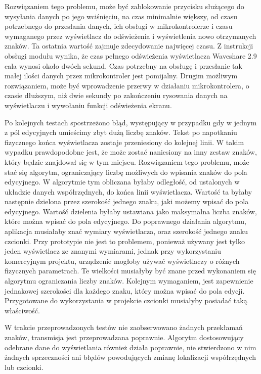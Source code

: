 \documentclass[a4paper,12pt, twoside]{article}
\begin{document}
    	Rozwiązaniem tego problemu, może być zablokowanie przycisku służącego do wysyłania danych po jego wciśnięciu, na czas minimalnie większy, od czasu potrzebnego do przesłania danych, ich obsługi w mikrokontrolerze i czasu wymaganego przez wyświetlacz do odświeżenia i wyświetlenia nowo otrzymanych znaków. Ta ostatnia wartość zajmuje zdecydowanie najwięcej czasu. Z instrukcji obsługi modułu wynika, że czas pełnego odświeżenia wyświetlacza Waveshare 2.9 cala wynosi około dwóch sekund\cite{waveshare}. Czas potrzebny na obsługę i przesłanie tak małej ilości danych przez mikrokontroler jest pomijalny. Drugim możliwym rozwiązaniem, może być wprowadzenie przerwy w działaniu mikrokontrolera, o czasie dłuższym, niż dwie sekundy po zakończeniu rysowania danych na wyświetlaczu i wywołaniu funkcji odświeżenia ekranu. 
        
        Po kolejnych testach spostrzeżono błąd, występujący w przypadku gdy w jednym z pól edycyjnych umieścimy zbyt dużą liczbę znaków. Tekst po napotkaniu fizycznego końca wyświetlacza zostaje przeniesiony do kolejnej linii. W takim wypadku prawdopodobne jest, że może zostać naniesiony na inny zestaw znaków, który będzie znajdował się w tym miejscu. Rozwiązaniem tego problemu, może stać się algorytm, ograniczający liczbę możliwych do wpisania znaków do pola edycyjnego. W algorytmie tym obliczana byłaby odległość, od ustalonych w układzie danych współrzędnych, do końca linii wyświetlacza. Wartość ta byłaby następnie dzielona przez szerokość jednego znaku, jaki możemy wpisać do pola edycyjnego. Wartość dzielenia byłaby ustawiana jako maksymalna liczba znaków, które można wpisać do pola edycyjnego. Do poprawnego działania algorytmu, aplikacja musiałaby znać wymiary wyświetlacza, oraz szerokość jednego znaku czcionki. Przy prototypie nie jest to problemem, ponieważ używany jest tylko jeden wyświetlacz ze znanymi wymiarami, jednak przy wykorzystaniu komercyjnym projektu, urządzenie mogłoby używać wyświetlaczy o różnych fizycznych parametrach. Te wielkości musiałyby być znane przed wykonaniem się algorytmu ograniczania liczby znaków. Kolejnym wymaganiem, jest zapewnienie jednakowej szerokości dla każdego znaku, który można wpisać do pola edycji. Przygotowane do wykorzystania w projekcie czcionki musiałyby posiadać taką właściwość.

    	
    	W trakcie przeprowadzonych testów nie zaobserwowano żadnych przekłamań znaków, transmisja jest przeprowadzana poprawnie. Algorytm dostosowujący odebrane dane do wyświetlania również działa poprawnie, nie stwierdzono w nim żadnych sprzeczności ani błędów powodujących zmianę lokalizacji współrzędnych lub czcionki.
    	
\end{document}
